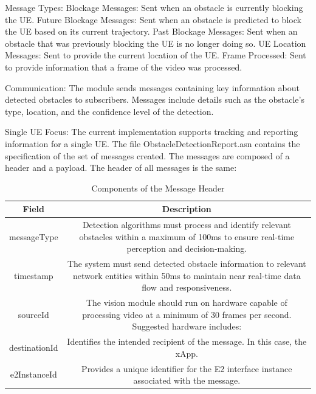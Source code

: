     Message Types:
        Blockage Messages: Sent when an obstacle is currently blocking the UE.
        Future Blockage Messages: Sent when an obstacle is predicted to block the UE based on its current trajectory.
        Past Blockage Messages: Sent when an obstacle that was previously blocking the UE is no longer doing so.
        UE Location Messages: Sent to provide the current location of the UE.
        Frame Processed: Sent to provide information that a frame of the video was processed.

    Communication:
        The module sends messages containing key information about detected obstacles to subscribers.
        Messages include details such as the obstacle's type, location, and the confidence level of the detection.

    Single UE Focus:
        The current implementation supports tracking and reporting information for a single UE.
The file ObstacleDetectionReport.asn contains the specification of the set of messages created. The messages are composed of a header and a payload. The header of all messages is the same: 


\begin{table}[H]
    \caption{Components of the Message Header}
    \label{tab:header}
    \centering
    \begin{tabular}{|c|c|}
        \hline
        \textbf{Field}                     & \textbf{Description}                                                                                                                                 \\ \hline
        messageType                        & Detection algorithms must process and identify relevant obstacles within a maximum of 100ms to ensure real-time perception and decision-making.      \\ \hline
        timestamp                          & The system must send detected obstacle information to relevant network entities within 50ms to maintain near real-time data flow and responsiveness. \\ \hline
        sourceId                           & The vision module should run on hardware capable of processing video at a minimum of 30 frames per second. Suggested hardware includes:              \\ \hline
        destinationId                      & Identifies the intended recipient of the message. In this case, the xApp.                                                                                                                                                     \\ \hline
        e2InstanceId &                      Provides a unique identifier for the E2 interface instance associated with the message.                                                                                                          \\ \hline
    \end{tabular}
\end{table}

